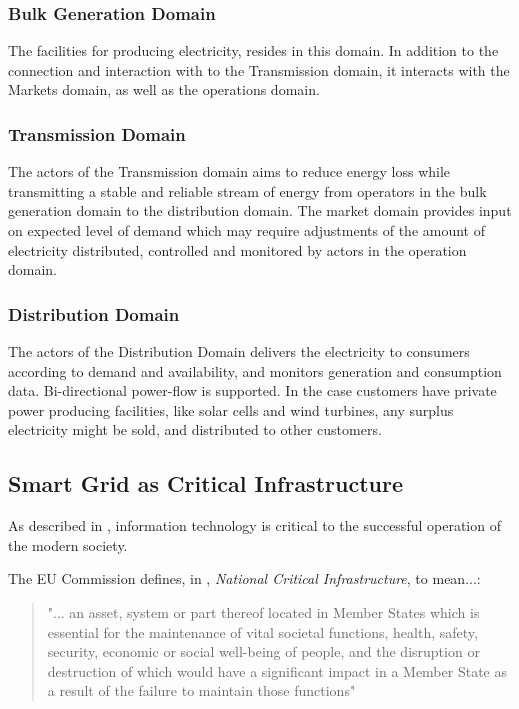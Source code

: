     \subsubsection{Bulk Generation Domain} The facilities for producing electricity, resides in this domain. In addition to the connection and interaction with  to the Transmission domain, it interacts with the Markets domain, as well as the operations domain.  
    \subsubsection{Transmission Domain} The actors of the Transmission domain aims to reduce energy loss while transmitting a stable and reliable stream of energy from operators in the bulk generation domain to the distribution domain. The market domain provides input on expected level of demand which may require adjustments of the amount of electricity distributed, controlled and monitored by actors in the operation domain.  
    \subsubsection{Distribution Domain} The actors of the Distribution Domain delivers the electricity to consumers according to demand and availability, and monitors generation and consumption data. Bi-directional power-flow is supported. In the case customers have private  power producing facilities, like solar cells and wind turbines, any surplus electricity might be sold, and distributed to other customers.

\subsection{Smart Grid as Critical Infrastructure}



As described in \cite{colesniuc2013cyberspace}, information technology is critical to the successful operation of the modern society.




 
 The EU Commission defines, in \cite{eu2008council}, \textit{National Critical Infrastructure}, to mean...:
 
 \begin{quote}
    "... an asset, system or part thereof
located in Member States which is essential for the maintenance of vital societal functions, health, safety, security,
economic or social well-being of people, and the disruption
or destruction of which would have a significant impact in a
Member State as a result of the failure to maintain those
functions"   \cite[p.  L 345/77]{eu2008council}  
 \end{quote}
 
